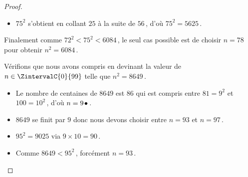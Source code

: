 \begin{proof}
\begin{itemize}
		\item $75^2$ s'obtient en collant $25$ à la suite de $56$\,, d'où $75^2=5625$\,.
    \end{itemize}
    
    Finalement comme $72^2 < 75^2 < 6084$\,, le seul cas possible est de choisir $n = 78$ pour obtenir $n^2 = 6084$\,.
    
    \medskip

    Vérifions que nous avons compris en devinant la valeur de $n \in \ZintervalC{0}{99}$ telle que $n^2 = 8649$\,.
    
    \begin{itemize}
		\item Le nombre de centaines de $8649$ est $86$ qui est compris entre $81 = 9^2$ et $100 = 10^2$\,, d'où $n = 9\kern1pt\bullet$\,.
		
    	\item $8649$ se finit par $9$ donc nous devons choisir entre $n = 93$ et $n=97$\,.
		
    	\item $95^2 = 9025$ via $9 \times 10 = 90$\,.
		
    	\item Comme $8649 < 95^2$\,, forcément $n = 93$\,.
    \end{itemize}
\end{proof}
